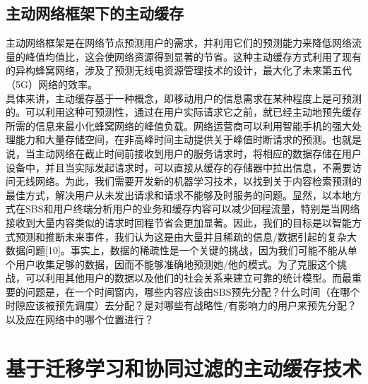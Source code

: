 \documentclass[bachelor]{seuthesis} %
\begin{document}
\begin{Main}
\section{主动网络框架下的主动缓存}
主动网络框架是在网络节点预测用户的需求，并利用它们的预测能力来降低网络流量的峰值均值比，这会使网络资源得到显著的节省。这种主动缓存方式利用了现有的异构蜂窝网络，涉及了预测无线电资源管理技术的设计，最大化了未来第五代（5G）网络的效率。\\
具体来讲，主动缓存基于一种概念，即移动用户的信息需求在某种程度上是可预测的。可以利用这种可预测性，通过在用户实际请求它之前，就已经主动地预先缓存所需的信息来最小化蜂窝网络的峰值负载。网络运营商可以利用智能手机的强大处理能力和大量存储空间，在非高峰时间主动提供关于峰值时断请求的预测。也就是说，当主动网络在截止时间前接收到用户的服务请求时，将相应的数据存储在用户设备中，并且当实际发起请求时，可以直接从缓存的存储器中拉出信息，不需要访问无线网络。为此，我们需要开发新的机器学习技术，以找到关于内容检索预测的最佳方式，解决用户从未发出请求和请求不能够及时服务的问题。显然，以本地方式在SBS和用户终端分析用户的业务和缓存内容可以减少回程流量，特别是当网络接收到大量内容类似的请求时回程节省会更加显著。因此，我们的目标是以智能方式预测和推断未来事件，我们认为这是由大量并且稀疏的信息/数据引起的复杂大数据问题[10]。事实上，数据的稀疏性是一个关键的挑战，因为我们可能不能从单个用户收集足够的数据，因而不能够准确地预测她/他的模式。为了克服这个挑战，可以利用其他用户的数据以及他们的社会关系来建立可靠的统计模型。而最重要的问题是，在一个时间窗内，哪些内容应该由SBS预先分配？什么时间（在哪个时隙应该被预先调度）去分配？是对哪些有战略性/有影响力的用户来预先分配？以及应在网络中的哪个位置进行？

\chapter{基于迁移学习和协同过滤的主动缓存技术}

\end{Main}
\end{document}
